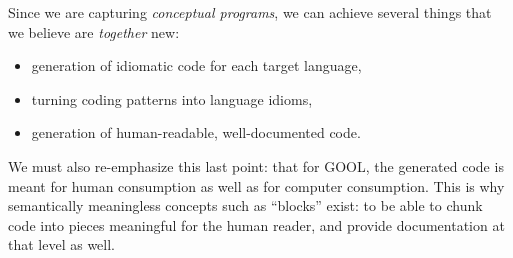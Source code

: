 \documentclass[sigplan,review,prologue,dvipsnames]{acmart}
\begin{document}
Since we are capturing \emph{conceptual programs}, we can achieve
several things that we believe are \emph{together} new:
\begin{itemize}
\item generation of idiomatic code for each target language,
\item turning coding patterns into language idioms,
\item generation of human-readable, well-documented code.
\end{itemize}

We must also re-emphasize this last point: that for GOOL, the generated code
is meant for human consumption as well as for computer consumption. This is
why semantically meaningless concepts such as ``blocks'' exist: to be able
to chunk code into pieces meaningful for the human reader, and provide
documentation at that level as well.






% 
% 
\end{document}
